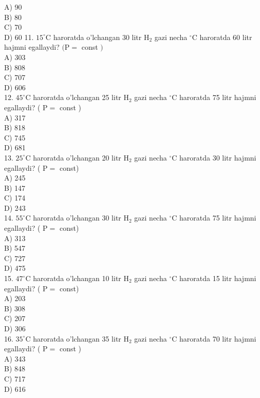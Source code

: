 A) 90\\
B) 80\\
C) 70\\
D) 60
11. $15^{\circ} \mathrm{C}$ haroratda o'lchangan 30 litr $\mathrm{H}_{2}$ gazi necha ${ }^{\circ} \mathrm{C}$ haroratda 60 litr hajmni egallaydi? $(\mathrm{P}=$ const $)$\\
A) 303\\
B) 808\\
C) 707\\
D) 606\\

12. $45^{\circ} \mathrm{C}$ haroratda o'lchangan 25 litr $\mathrm{H}_{2}$ gazi necha ${ }^{\circ} \mathrm{C}$ haroratda 75 litr hajmni egallaydi? ( $\mathrm{P}=$ const )\\
A) 317\\
B) 818\\
C) 745\\
D) 681\\
13. $25^{\circ} \mathrm{C}$ haroratda o'lchangan 20 litr $\mathrm{H}_{2}$ gazi necha ${ }^{\circ} \mathrm{C}$ haroratda 30 litr hajmni egallaydi? ( $\mathrm{P}=$ const)\\
A) 245\\
B) 147\\
C) 174\\
D) 243\\
14. $55^{\circ} \mathrm{C}$ haroratda o'lchangan 30 litr $\mathrm{H}_{2}$ gazi necha ${ }^{\circ} \mathrm{C}$ haroratda 75 litr hajmni egallaydi? ( $\mathrm{P}=$ const)\\
A) 313\\
B) 547\\
C) 727\\
D) 475\\
15. $47^{\circ} \mathrm{C}$ haroratda o'lchangan 10 litr $\mathrm{H}_{2}$ gazi necha ${ }^{\circ} \mathrm{C}$ haroratda 15 litr hajmni egallaydi? ( $\mathrm{P}=$ const)\\
A) 203\\
B) 308\\
C) 207\\
D) 306\\
16. $35^{\circ} \mathrm{C}$ haroratda o'lchangan 35 litr $\mathrm{H}_{2}$ gazi necha ${ }^{\circ} \mathrm{C}$ haroratda 70 litr hajmni egallaydi? ( $\mathrm{P}=$ const )\\
A) 343\\
B) 848\\
C) 717\\
D) 616\\
